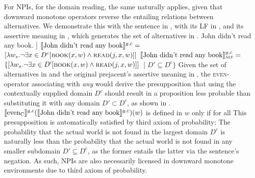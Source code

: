 For NPIs, for the domain reading, the same naturally applies, given that downward monotone operators reverse the entailing relations between alternatives. We demonstrate this with the sentence in , with its LF in , and its assertive meaning in , which generates the set of alternatives in .
\pex
\a John didn't read any book.
\a[] [even\textsubscript{C} [not [John read any book]]
\a $\intension[g,c]{John didn't read any book}=$\\\emptyfill$[\lambda{w_s}.\neg\exists{x\in D^c}[\predicate{book}(x,w)\land\predicate{read}(j,x,w)]]$
\a $\intension[g,c]{John didn't read any book}_{\text{\scshape alt}}=$\\\emptyfill$\{[\lambda{w_s}.\neg\exists{x\in D'}[\predicate{book}(x,w)\land\predicate{read}(j,x,w)]]$~| $D'\subseteq D^c\}$
\xe
Given the set of alternatives in  and the original prejacent's assertive meaning in , the {\scshape even}-operator associating with \textit{any} would derive the presupposition that using the contextually supplied domain $D^c$ should result in a proposition less probable than substituting it with any domain $D'\subset D^c$, as shown in .
\ex
$\intension[g,c]{even\textsubscript{C}}(\intension[g,c]{John didn't read any book})(w)$ is defined in $w$ only if for all\linebreak{}
\xe
This presupposition is automatically satisfied by  third axiom of probability: The probability that the actual world is not found in the largest domain $D^c$ is naturally less than the probability that the actual world is not found in any smaller subdomain $D'\subseteq D^c$, as the former entails the latter via the sentence's negation. As such, NPIs are also necessarily licensed in downward monotone environments due to  third axiom of probability.

